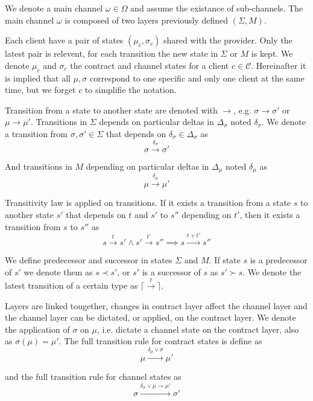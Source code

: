 \documentclass{llncs}
\begin{document}
We denote a main channel $\omega \in \Omega$ and assume the existance of sub-channels. The main channel $\omega$ is composed of two layers previously defined $(\Sigma, M)$.

Each client have a pair of states $(\mu_c, \sigma_c)$ shared with the provider. Only the latest pair is relevent, for each transition the new state in $\Sigma$ or $M$ is kept. We denote $\mu_c$ and $\sigma_c$ the contract and channel states for a client $c \in \mathcal{C}$. Hereinafter it is implied that all $\mu, \sigma$ correspond to one specific and only one client at the same time, but we forget $c$ to simplifie the notation.

Transition from a state to another state are denoted with $\rightarrow$, e.g. $\sigma \rightarrow \sigma'$ or $\mu \rightarrow \mu'$. Transitions in $\Sigma$ depends on particular deltas in $\Delta_\sigma$ noted $\delta_\sigma$. We denote a transition from $\sigma, \sigma' \in \Sigma$ that depends on $\delta_\sigma \in \Delta_\sigma$ as
$$\sigma \xrightarrow{\delta_\sigma} \sigma'$$

And transitions in $M$ depending on particular deltas in $\Delta_\mu$ noted $\delta_\mu$ as
$$\mu \xrightarrow{\delta_\mu} \mu'$$

Transitivity law is applied on transitions. If it exists a transition from a state $s$ to another state $s'$ that depends on $t$ and $s'$ to $s''$ depending on $t'$, then it exists a transition from $s$ to $s''$ as
$$s \xrightarrow{t} s' \land s' \xrightarrow{t'} s'' \implies s \xrightarrow{t + t'} s''$$

We define predecessor and successor in states $\Sigma$ and $M$. If state $s$ is a predecessor of $s'$ we denote them as $s \prec s'$, or $s'$ is a successor of $s$ as $s' \succ s$. We denote the latest transition of a certain type as $\lceil \xrightarrow{t} \rceil$.

Layers are linked tougether, changes in contract layer affect the channel layer and the channel layer can be dictated, or applied, on the contract layer. We denote the application of $\sigma$ on $\mu$, i.e. dictate a channel state on the contract layer, also as $\sigma(\mu) = \mu'$. The full transition rule for contract states is define as
$$\mu \xrightarrow{\delta_\mu \lor \sigma} \mu'$$

and the full transition rule for channel states as
$$\sigma \xrightarrow{\delta_\sigma \lor \mu \rightarrow \mu'} \sigma'$$
\end{document}
